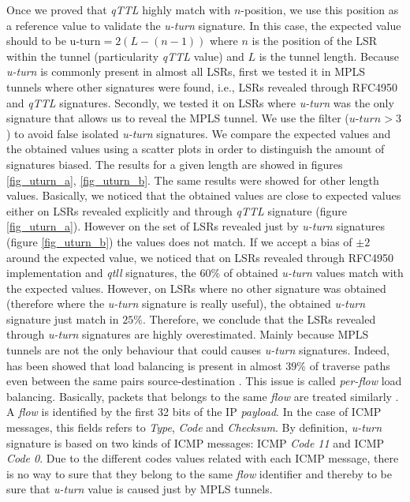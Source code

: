 Once we proved  that \textit{qTTL} highly match with  $n$-position, we use
this position as a reference value to validate the \textit{u-turn} signature. In
this case, the expected value should to be $\text{u-turn}=2(L-(n-1))$ where $n$ is the
position of the LSR within the tunnel (particularity \textit{qTTL} value) and $L$ is the tunnel length. Because
\textit{u-turn} is commonly present in almost all LSRs, first we tested it in
MPLS tunnels  where other signatures were found, i.e., LSRs revealed
through RFC4950 and \textit{qTTL} signatures.
Secondly, we tested it on LSRs where \textit{u-turn} was the only
signature that allows us to reveal the MPLS tunnel. We use the filter ($\textit{u-turn}>3$) to
avoid false isolated \textit{u-turn} signatures. We compare the expected values and the
obtained values using a scatter plots in order to distinguish the amount of
signatures biased. The results for a given length are showed in figures
\ref{fig_uturn_a}, \ref{fig_uturn_b}. The same results were showed for other length values. Basically, we noticed that the obtained values are close to expected values either on LSRs revealed explicitly and through \textit{qTTL} signature (figure \ref{fig_uturn_a}). However on the set of  LSRs revealed just by \textit{u-turn} signatures (figure \ref{fig_uturn_b}) the values does not match. If we accept a bias of $ \pm 2$ around the expected value, we
noticed that on LSRs revealed through RFC4950 implementation and
\textit{qtll} signatures, the $60\%$ of obtained \textit{u-turn} values match
with the expected values. However, on LSRs
where no other signature was obtained (therefore where the \textit{u-turn} signature
is really useful), the obtained \textit{u-turn} signature just match in $25\%$. 
Therefore, we conclude that the LSRs revealed through \textit{u-turn}
signatures are highly overestimated. Mainly because MPLS tunnels are not the
only behaviour that could causes \textit{u-turn} signatures. Indeed, has been showed that load balancing is present in almost $39\%$ of traverse paths even between the same pairs source-destination \cite{BRICE07}. This issue is called \textit{per-flow} load balancing. Basically, packets that belongs to the same \textit{flow} are treated similarly \cite{BRICE06}. A \textit{flow} is identified by the first 32 bits of the IP \textit{payload}. In the case of ICMP messages, this fields refers to \textit{Type},
\textit{Code} and \textit{Checksum}. By definition, \textit{u-turn} signature is
based on two kinds of ICMP messages: ICMP \echoreply \textit{Code 11} and ICMP
\ttlexceeded \textit{Code 0}. Due to the different codes values
related with each ICMP message, there is no way to sure that they belong to the same \textit{flow} identifier and thereby to be sure that \textit{u-turn} value is caused just by MPLS tunnels.
